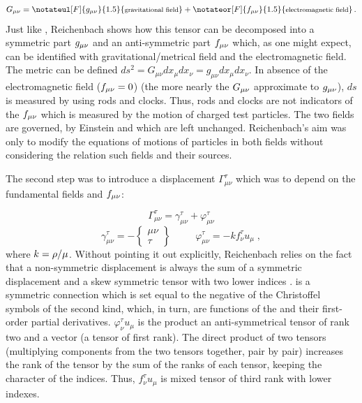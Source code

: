 \documentclass[submitted]{article}
\newcommand{\texts}[1]{\text{\footnotesize{#1}}}
\newcommand{\faradaymn}{\ensuremath{f\mn}}
\newcommand{\ctmrd}{\ensuremath{\hfrac{\rho}{\mu}}\xspace}
\begin{document}
\begin{equation}
\label{eq:ft} 
G_{\mu\nu}=\notateul[F]{g_{\mu\nu}}{1.5}{\texts{gravitational field}}+\notateor[F]{f_{\mu\nu}}{1.5}{\texts{electromagnetic field}}\,.
\end{equation}
%
Just like \citet{Eddington1921}, Reichenbach shows how this tensor can be decomposed into a symmetric part $g_{\mu\nu}$ and an anti-symmetric part $f_{\mu\nu}$ which, as one might expect, can be identified with gravitational/metrical field and the electromagnetic field. The metric can be defined $d s^2=G_{\mu\nu}d x_\mu d x_\nu= g_{\mu\nu}d x_\mu d x_\nu$. In absence of the electromagnetic field ($f_{\mu\nu}=0$) (the more nearly the $G_{\mu\nu}$ approximate to $g_{\mu\nu}$), $ds$ is measured by using rods and clocks. Thus, rods and clocks are not indicators of the $f_{\mu\nu}$ which is measured by the motion of charged test particles. The two fields are governed, by Einstein and \ME which are left unchanged. Reichenbach's aim was only to modify the equations of motions of particles in both fields without considering the relation such fields and their sources. 

The second step was to introduce a displacement $\Gamma_{\mu\nu}^{\tau}$ which was to depend on the fundamental fields \gmn and \faradaymn:

\begin{equation}
\label{eq:ds}
\Gamma_{\mu\nu}^{\tau}=\gamma_{\mu\nu}^{\tau}+\varphi_{\mu\nu}^{\tau}
\end{equation}
%
\begin{equation}
\label{eq:dsd}
\gamma^\tau_{\mu\nu}=-\begin{Bmatrix} \mu\nu \\ \tau \end{Bmatrix} \;\;\;\;\;\;\;\;\; \varphi^{\tau}_{\mu\nu}=-k f^\tau_\nu u_\mu\;,
\end{equation}
%
where $k=\ctmrd$. Without pointing it out explicitly, Reichenbach relies on the fact that a non-symmetric displacement is always the sum of a symmetric displacement and a skew symmetric tensor with two lower indices \citep[see][851]{Schouten1924}. \gtmn is a symmetric connection which is set equal to the negative of the Christoffel symbols of the second kind, which, in turn, are functions of the \gmn and their first-order partial derivatives. $\varphi^\tau_\nu u_\mu$ is the product an anti-symmetrical tensor of rank two and  a vector (a tensor of first rank). The direct product of two tensors (multiplying components from the two tensors together, pair by pair) increases the rank of the tensor by the sum of the ranks of each tensor, keeping the character of the indices. Thus, $f^\tau_\nu u_\mu$ is mixed tensor of third rank with lower indexes.
\end{document}
